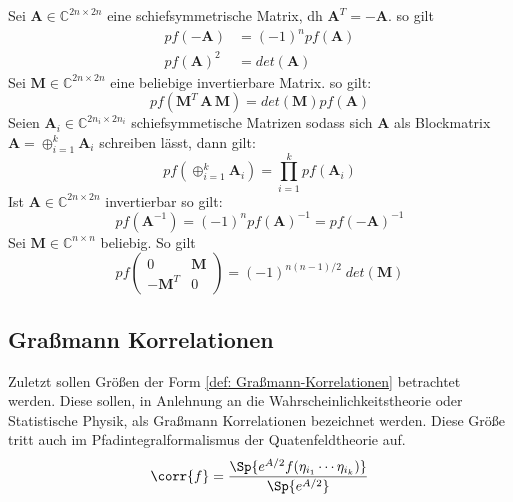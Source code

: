 \begin{grayframe}[frametitle = {Eigenschaften von Pfaffschen Determinanten}]
    Sei $\bm{A} \in \mathbb{C}^{2n\times2n}$ eine schiefsymmetrische Matrix, dh $\bm{A}^T = -\bm{A}$. so gilt
        \begin{align}
            pf(-\bm{A}) &= (-1)^n pf(\bm{A}) \label{eq:pfaff 1}\\
            pf(\bm{A})^2 &= det(\bm{A})      \label{eq:pfaff 2}
        \end{align}
    Sei $\bm{M} \in \mathbb{C}^{2n\times2n} $ eine beliebige invertierbare Matrix. so gilt:
        \begin{equation}
            pf(\bm{M}^T \,\bm{A}\, \bm{M}) = det(\bm{M}) pf(\bm{A}) \label{eq:pfaff 3}
        \end{equation}
    Seien $\bm{A}_i \in \mathbb{C}^{2n_i\times2n_i}$ schiefsymmetische Matrizen sodass sich $\bm{A}$ als Blockmatrix $\bm{A} = \oplus_{i = 1}^k \bm{A}_i$ schreiben lässt, dann gilt:
        \begin{equation}
            pf(\oplus_{i = 1}^k \bm{A}_i) = \prod_{i=1}^k pf(\bm{A}_i) \label{eq:pfaff 4}
        \end{equation}
    Ist $\bm{A} \in \mathbb{C}^{2n\times2n}$ invertierbar so gilt:
        \begin{equation}
        pf(\bm{A}^{-1}) = (-1)^n pf(\bm{A})^{-1} = pf(-\bm{A})^{-1} \label{eq:pfaff 5}
        \end{equation}
    Sei $\bm{M} \in \mathbb{C}^{n\times n} $ beliebig. So gilt
        \begin{equation}
            pf\left(
                \begin{array}{cc}
                    0    & \bm{M} \\
                    -\bm{M}^T & 0 
                \end{array}
            \right) = (-1)^{n(n-1)/2} \; det(\bm{M}) \label{eq:pfaff 6}
        \end{equation}
\end{grayframe}

\subsection{Graßmann Korrelationen}

Zuletzt sollen Größen der Form \eqref{def: Graßmann-Korrelationen} betrachtet werden. Diese sollen, in  Anlehnung an die Wahrscheinlichkeitstheorie oder Statistische Physik, als Graßmann Korrelationen bezeichnet werden. Diese Größe tritt auch im Pfadintegralformalismus der Quatenfeldtheorie auf. 
\begin{equation} \label{def: Graßmann-Korrelationen}
\corr{f} = \frac{\Sp{e^{A/2} f(\eta_{i_1} \cdots \eta_{i_k})}}{\Sp{e^{A/2}}} 
\end{equation}

